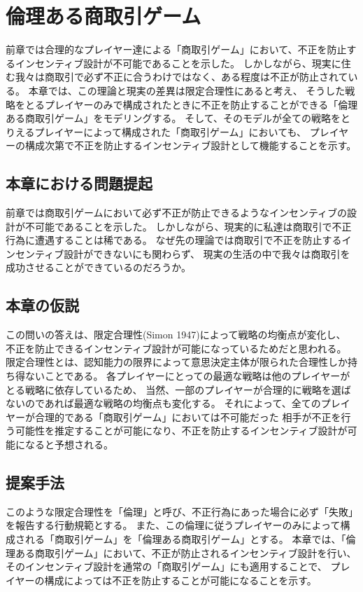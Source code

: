 \chapter{倫理ある商取引ゲーム}
前章では合理的なプレイヤー達による「商取引ゲーム」において、不正を防止するインセンティブ設計が不可能であることを示した。
しかしながら、現実に住む我々は商取引で必ず不正に合うわけではなく、ある程度は不正が防止されている。
本章では、この理論と現実の差異は限定合理性にあると考え、
そうした戦略をとるプレイヤーのみで構成されたときに不正を防止することができる「倫理ある商取引ゲーム」をモデリングする。
そして、そのモデルが全ての戦略をとりえるプレイヤーによって構成された「商取引ゲーム」においても、
プレイヤーの構成次第で不正を防止するインセンティブ設計として機能することを示す。

\section{本章における問題提起}
前章では商取引ゲームにおいて必ず不正が防止できるようなインセンティブの設計が不可能であることを示した。
しかしながら、現実的に私達は商取引で不正行為に遭遇することは稀である。
なぜ先の理論では商取引で不正を防止するインセンティブ設計ができないにも関わらず、
現実の生活の中で我々は商取引を成功させることができているのだろうか。

\section{本章の仮説}
この問いの答えは、限定合理性(Simon 1947\cite{simon 1947})によって戦略の均衡点が変化し、
不正を防止できるインセンティブ設計が可能になっているためだと思われる。
限定合理性とは、認知能力の限界によって意思決定主体が限られた合理性しか持ち得ないことである。
各プレイヤーにとっての最適な戦略は他のプレイヤーがとる戦略に依存しているため、
当然、一部のプレイヤーが合理的に戦略を選ばないのであれば最適な戦略の均衡点も変化する。
それによって、全てのプレイヤーが合理的である「商取引ゲーム」においては不可能だった
相手が不正を行う可能性を推定することが可能になり、不正を防止するインセンティブ設計が可能になると予想される。

\section{提案手法}
このような限定合理性を「倫理」と呼び、不正行為にあった場合に必ず「失敗」を報告する行動規範とする。
また、この倫理に従うプレイヤーのみによって構成される「商取引ゲーム」を「倫理ある商取引ゲーム」とする。
本章では、「倫理ある商取引ゲーム」において、不正が防止されるインセンティブ設計を行い、
そのインセンティブ設計を通常の「商取引ゲーム」にも適用することで、
プレイヤーの構成によっては不正を防止することが可能になることを示す。

